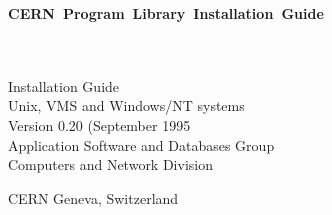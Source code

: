
\begin{titlepage}
\vspace*{-23mm}
\mbox{}
\hfill
{}\hbox{\Large\bf CERN Program Library Installation Guide}
\hfill\mbox{}
\begin{center}
\mbox{}\\[10mm]
\mbox{}\\[2cm]
{\LARGE Installation Guide}\\[1cm]
{\LARGE Unix, VMS and Windows/NT systems}\\[1cm]
{\LARGE Version 0.20 (September 1995}\\[2cm]
{\Large Application Software and Databases Group}\\[1cm]
{\Large Computers and Network Division}\\[2cm]
\end{center}
\vfill
\begin{center}\Large CERN Geneva, Switzerland\end{center}
\end{titlepage}

